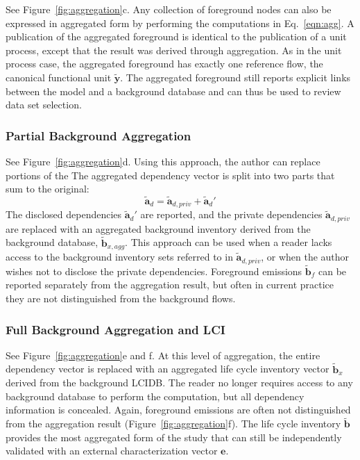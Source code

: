 See Figure~\ref{fig:aggregation}c. Any collection of foreground nodes can also be expressed in aggregated form by performing the computations in Eq.~\ref{eqn:agg}.  A publication of the aggregated foreground is identical to the publication of a unit process, except that the result was derived through aggregation.  As in the unit process case, the aggregated foreground has exactly one reference flow, the canonical functional unit $\tilde{\mathbf{y}}$.  The aggregated foreground still reports explicit links between the model and a background database and can thus be used to review data set selection.

\subsubsection{Partial Background Aggregation}

See Figure~\ref{fig:aggregation}d.  Using this approach, the author can replace portions of the
The aggregated dependency vector is split into two parts that sum to the original:
\begin{equation}
 \tilde{\mathbf{a}}_d = \tilde{\mathbf{a}}_{d,priv} + \tilde{\mathbf{a}}_d'
\end{equation}
The disclosed dependencies $\tilde{\mathbf{a}}_d'$ are reported, and the private dependencies $\tilde{\mathbf{a}}_{d,priv}$ are replaced with an aggregated background inventory derived from the background database, $\tilde{\mathbf{b}}_{x,agg}$.  This approach can be used when a reader lacks access to the background inventory sets referred to in $\tilde{\mathbf{a}}_{d,priv}$, or when the author wishes not to disclose the private dependencies.  Foreground emissions $\tilde{\mathbf{b}}_f$ can be reported separately from the aggregation result, but often in current practice they are not distinguished from the background flows.  

\subsubsection{Full Background Aggregation and LCI}

See Figure~\ref{fig:aggregation}e and f. At this level of aggregation, the entire dependency vector is replaced with an aggregated life cycle inventory vector $\tilde{\mathbf{b}}_x$ derived from the background LCIDB.  The reader no longer requires access to any background database to perform the computation, but all dependency information is concealed.  Again, foreground emissions are often not distinguished from the aggregation result (Figure~\ref{fig:aggregation}f).  The life cycle inventory $\tilde{\mathbf{b}}$ provides the most aggregated form of the study that can still be independently validated with an external characterization vector $\mathbf{e}$.  

